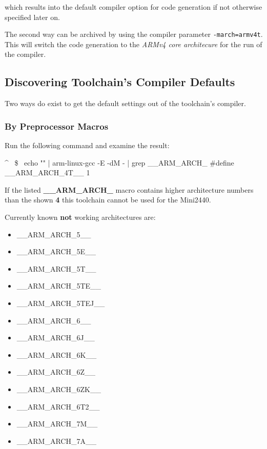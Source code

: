 which results into the default compiler option for code generation if not
otherwise specified later on.

The second way can be archived by using the compiler parameter
\texttt{-march=armv4t}. This will switch the code generation to the
\textit{ARMv4 core architecure} for the run of the compiler.

\subsection{Discovering Toolchain's Compiler Defaults}

Two ways do exist to get the default settings out of the toolchain's compiler.

\subsubsection{By Preprocessor Macros}

Run the following command and examine the result:

\begin{ptxshell}[escapechar=~]{^}
~\$~ echo "" | arm-linux-gcc -E -dM - | grep __ARM_ARCH_
#define __ARM_ARCH_4T__ 1
\end{ptxshell}

If the listed \textbf{\_\_ARM\_ARCH\_} macro contains higher architecture numbers
than the shown \textbf{4} this toolchain cannot be used for the Mini2440.

Currently known \textbf{not} working architectures are:

\begin{itemize}
	\item \_\_ARM\_ARCH\_5\_\_
	\item \_\_ARM\_ARCH\_5E\_\_
	\item \_\_ARM\_ARCH\_5T\_\_
	\item \_\_ARM\_ARCH\_5TE\_\_
	\item \_\_ARM\_ARCH\_5TEJ\_\_
	\item \_\_ARM\_ARCH\_6\_\_
	\item \_\_ARM\_ARCH\_6J\_\_
	\item \_\_ARM\_ARCH\_6K\_\_
	\item \_\_ARM\_ARCH\_6Z\_\_
	\item \_\_ARM\_ARCH\_6ZK\_\_
	\item \_\_ARM\_ARCH\_6T2\_\_
	\item \_\_ARM\_ARCH\_7M\_\_
	\item \_\_ARM\_ARCH\_7A\_\_
\end{itemize}

